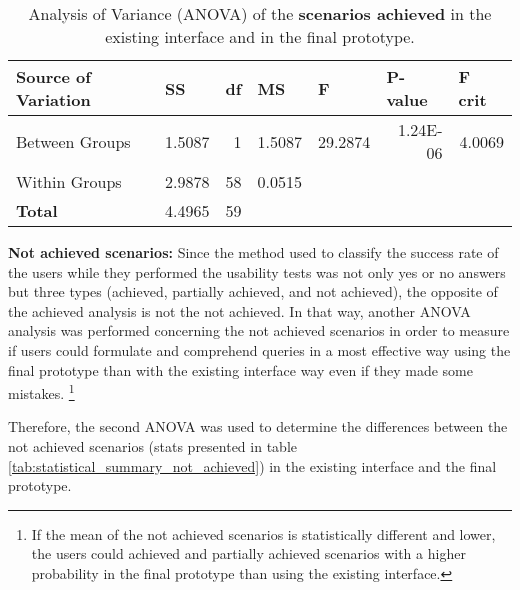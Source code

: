 \begin{table}[tb]
  \caption{Analysis of Variance (ANOVA) of the \textbf{scenarios achieved} in the existing interface and in the final prototype.}
	\label{tab:anova_achieved}
  \begin{tabular}{@{}lllllll@{}}
  \toprule
  \textbf{Source of Variation} & \textbf{SS}                & \textbf{df}            & \textbf{MS}                & \textbf{F}                  & \textbf{P-value}             & \textbf{F crit}            \\ \midrule
  Between Groups               & \multicolumn{1}{r}{1.5087} & \multicolumn{1}{r}{1}  & \multicolumn{1}{r}{1.5087} & \multicolumn{1}{r}{29.2874} & \multicolumn{1}{r}{1.24E-06} & \multicolumn{1}{r}{4.0069} \\
  Within Groups                & \multicolumn{1}{r}{2.9878} & \multicolumn{1}{r}{58} & \multicolumn{1}{r}{0.0515} &                             &                              &                            \\ \midrule
  \textbf{Total}               & 4.4965                     & 59                     &                            &                             &                              &                            \\ \bottomrule
  \end{tabular}
  \end{table}

\textbf{Not achieved scenarios:}
Since the method used to classify the success rate of the users while they performed the usability tests was not only yes or no answers but three types (achieved, partially achieved, and not achieved), the opposite of the achieved analysis is not the not achieved. In that way, another ANOVA analysis was performed concerning the not achieved scenarios in order to measure if users could formulate and comprehend queries in a most effective way using the final prototype than with the existing interface way even if they made some mistakes. \footnote{If the mean of the not achieved scenarios is statistically different and lower, the users could achieved and partially achieved scenarios with a higher probability in the final prototype than using the existing interface.}

Therefore, the second ANOVA was used to determine the differences between the not achieved scenarios (stats presented in table \ref{tab:statistical_summary_not_achieved}) in the existing interface and the final prototype.

